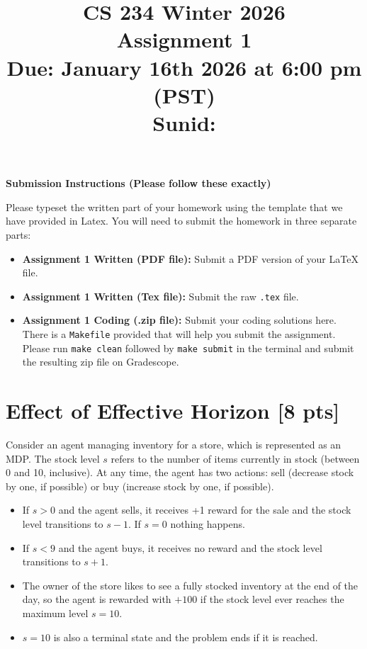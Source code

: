 \documentclass[11pt]{article}
\title{CS 234 Winter 2026 \\ Assignment 1 \\ Due: January 16th 2026 at 6:00 pm (PST) \\
Sunid: 
}
\date{}
\begin{document}
  \maketitle

\noindent\textbf{Submission Instructions (Please follow these exactly)}

\medskip

Please typeset the written part of your homework using the template that we have provided in Latex. You will need to submit the homework in three separate parts:
\begin{itemize}
    \item \textbf{Assignment 1 Written (PDF file):} Submit a PDF version of your \LaTeX{} file.
    \item \textbf{Assignment 1 Written (Tex file):} Submit the raw \texttt{.tex} file.
    \item \textbf{Assignment 1 Coding (.zip file):} Submit your coding solutions here. There is a \texttt{Makefile} provided that will help you submit the assignment. Please run \texttt{make clean} followed by \texttt{make submit} in the terminal and submit the resulting zip file on Gradescope.
\end{itemize}




\section{Effect of Effective Horizon [8 pts]} 

Consider an agent managing inventory for a store, which is represented as an MDP. The stock level $s$ refers to the number of items currently in stock (between 0 and 10, inclusive). At any time, the agent has two actions: sell (decrease stock by one, if possible) or buy (increase stock by one, if possible).  
\begin{itemize}
\item If $s 
 > 0$ and the agent sells, it receives +1 reward for the sale and the stock level transitions to $s - 1$. If $s = 0$ nothing happens.
 \item If $s < 9$ and the agent buys, it receives no reward and the stock level transitions to $s +  1$.
 \item The owner of the store likes to see a fully stocked inventory at the end of the day, so the agent is rewarded with $+100$ if the stock level ever reaches the maximum level $s = 10$.
 \item $s = 10$ is also a terminal state and the problem ends if it is reached.
\end{itemize}
\end{document}
